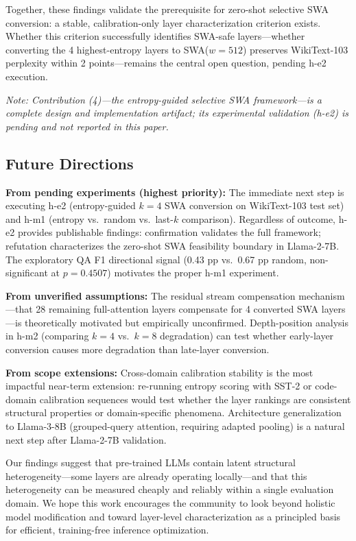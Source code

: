 Together, these findings validate the prerequisite for zero-shot selective SWA conversion: a stable, calibration-only layer characterization criterion exists. Whether this criterion successfully identifies SWA-safe layers---whether converting the 4 highest-entropy layers to SWA($w=512$) preserves WikiText-103 perplexity within 2 points---remains the central open question, pending h-e2 execution.

\textit{Note: Contribution (4)---the entropy-guided selective SWA framework---is a complete design and implementation artifact; its experimental validation (h-e2) is pending and not reported in this paper.}

\subsection*{Future Directions}

\textbf{From pending experiments (highest priority):} The immediate next step is executing h-e2 (entropy-guided $k=4$ SWA conversion on WikiText-103 test set) and h-m1 (entropy vs.\ random vs.\ last-$k$ comparison). Regardless of outcome, h-e2 provides publishable findings: confirmation validates the full framework; refutation characterizes the zero-shot SWA feasibility boundary in Llama-2-7B. The exploratory QA F1 directional signal (0.43 pp vs.\ 0.67 pp random, non-significant at $p = 0.4507$) motivates the proper h-m1 experiment.

\textbf{From unverified assumptions:} The residual stream compensation mechanism---that 28 remaining full-attention layers compensate for 4 converted SWA layers---is theoretically motivated but empirically unconfirmed. Depth-position analysis in h-m2 (comparing $k=4$ vs.\ $k=8$ degradation) can test whether early-layer conversion causes more degradation than late-layer conversion.

\textbf{From scope extensions:} Cross-domain calibration stability is the most impactful near-term extension: re-running entropy scoring with SST-2 or code-domain calibration sequences would test whether the layer rankings are consistent structural properties or domain-specific phenomena. Architecture generalization to Llama-3-8B (grouped-query attention, requiring adapted pooling) is a natural next step after Llama-2-7B validation.

Our findings suggest that pre-trained LLMs contain latent structural heterogeneity---some layers are already operating locally---and that this heterogeneity can be measured cheaply and reliably within a single evaluation domain. We hope this work encourages the community to look beyond holistic model modification and toward layer-level characterization as a principled basis for efficient, training-free inference optimization.
